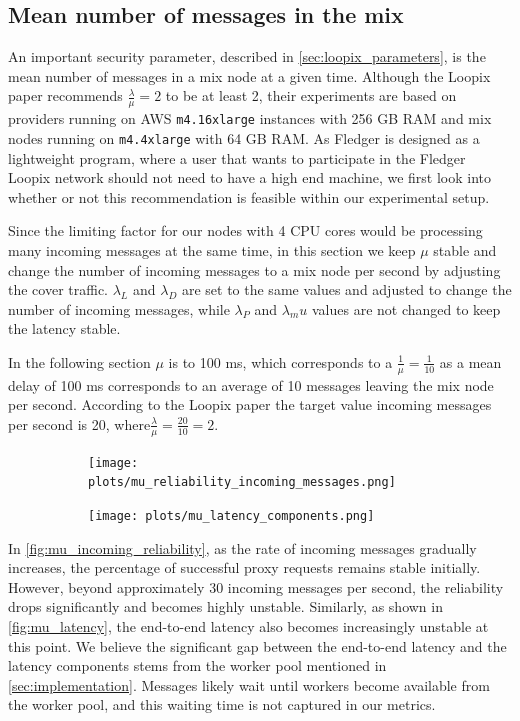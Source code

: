 \documentclass[a4paper,11pt,oneside]{report}
\begin{document}
\subsection{Mean number of messages in the mix}
An important security parameter, described in \autoref{sec:loopix_parameters}, is the mean number of messages in a mix node at a given time. Although the Loopix paper recommends \(\frac{\lambda}{\mu} = 2\) to be at least 2, their experiments are based on providers running on AWS \texttt{m4.16xlarge} instances with 256 GB RAM and mix nodes running on \texttt{m4.4xlarge} with 64 GB RAM. As Fledger is designed as a lightweight program, where a user that wants to participate in the Fledger Loopix network should not need to have a high end machine, we first look into whether or not this recommendation is feasible within our experimental setup.

Since the limiting factor for our nodes with 4 CPU cores would be processing many incoming messages at the same time, in this section we keep \(\mu\) stable and change the number of incoming messages to a mix node per second by adjusting the cover traffic. \(\lambda_L\) and \(\lambda_D\) are set to the same values and adjusted to change the number of incoming messages, while \(\lambda_P\) and \(\lambda_mu\) values are not changed to keep the latency stable.

In the following section \(\mu\) is to 100 ms, which corresponds to a \(\frac{1}{\mu} = \frac{1}{10}\) as a mean delay of 100 ms corresponds to an average of 10 messages leaving the mix node per second. According to the Loopix paper the target value incoming messages per second is 20, where\(\frac{\lambda}{\mu} = \frac{20}{10} = 2\).

\begin{figure}[H]
    \centering
    \begin{subfigure}{\textwidth}
        \centering
        \texttt{[image: plots/mu\_reliability\_incoming\_messages.png]}
        \caption{}
        \label{fig:mu_incoming_reliability}
    \end{subfigure}
    \hfill
    \centering
    \begin{subfigure}{\textwidth}
        \centering
        \texttt{[image: plots/mu\_latency\_components.png]}
        \caption{}
        \label{fig:mu_latency}
    \end{subfigure}
\end{figure}

In \autoref{fig:mu_incoming_reliability}, as the rate of incoming messages gradually increases, the percentage of successful proxy requests remains stable initially. However, beyond approximately 30 incoming messages per second, the reliability drops significantly and becomes highly unstable. Similarly, as shown in \autoref{fig:mu_latency}, the end-to-end latency also becomes increasingly unstable at this point. We believe the significant gap between the end-to-end latency and the latency components stems from the worker pool mentioned in \autoref{sec:implementation}. Messages likely wait until workers become available from the worker pool, and this waiting time is not captured in our metrics.
\end{document}
